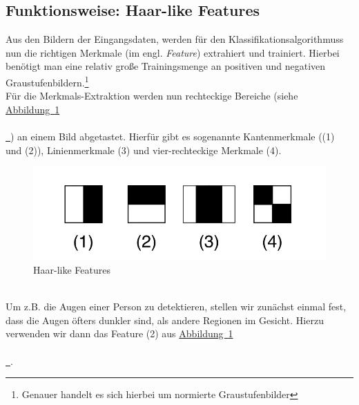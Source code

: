 \documentclass{article}
\newcommand*{\figref}[2][]{%
	\hyperref[{fig:#2}]{%
		Abbildung~\ref*{fig:#2}%
		\ifx\\#1\\%
		\else
		\,#1%
		\fi
	}%
}
\begin{document}
\subsection{Funktionsweise: Haar-like Features}
Aus den Bildern der Eingangsdaten, werden für den Klassifikationsalgorithmuss nun die richtigen Merkmale (im engl. \textit{Feature}) extrahiert und trainiert. 
Hierbei benötigt man eine relativ große Trainingsmenge an positiven und negativen Graustufenbildern.\footnote{Genauer handelt es sich hierbei um normierte Graustufenbilder} 
\newline \\
Für die Merkmals-Extraktion werden nun rechteckige Bereiche (siehe \figref{haar1}) an einem Bild abgetastet. Hierfür gibt es sogenannte Kantenmerkmale ((1) und (2)), Linienmerkmale (3) und vier-rechteckige Merkmale (4).
\newpage
\begin{figure}[h!]
	\centering
	\includegraphics[width=0.6\linewidth]{haar1}
	\caption{Haar-like Features}
	\label{fig:haar1}
\end{figure}
\ \\
Um z.B. die Augen einer Person zu detektieren, stellen wir zunächst einmal fest, dass die Augen öfters dunkler sind, als andere Regionen im Gesicht. Hierzu verwenden wir dann das Feature (2) aus \figref{haar1}.
\end{document}
